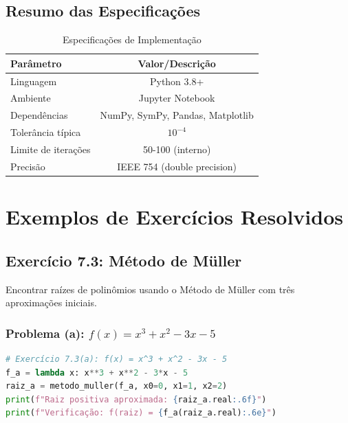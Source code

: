 \documentclass[
	12pt,				%
	openright,			%
	oneside,			%
	a4paper,			%
	english,			%
	brazil				%
	]{abntex2}
\begin{document}
\section{Resumo das Especificações}

\begin{table}[H]
    \centering
    \caption{Especificações de Implementação}
    \label{tab:especificacoes}
    \begin{tabular}{|l|c|}
    \hline
    \textbf{Parâmetro} & \textbf{Valor/Descrição} \\\hline
    Linguagem & Python 3.8+ \\\hline
    Ambiente & Jupyter Notebook \\\hline
    Dependências & NumPy, SymPy, Pandas, Matplotlib \\\hline
    Tolerância típica & $10^{-4}$ \\\hline
    Limite de iterações & 50-100 (interno) \\\hline
    Precisão & IEEE 754 (double precision) \\\hline
    \end{tabular}
\end{table}


\appendix

\chapter{Exemplos de Exercícios Resolvidos}

\section{Exercício 7.3: Método de Müller}

Encontrar raízes de polinômios usando o Método de Müller com três aproximações iniciais.

\subsection{Problema (a): $f(x) = x^3 + x^2 - 3x - 5$}

\begin{lstlisting}[language=Python, caption={Exercício 7.3(a) - Raiz via Müller}]
# Exercício 7.3(a): f(x) = x^3 + x^2 - 3x - 5
f_a = lambda x: x**3 + x**2 - 3*x - 5
raiz_a = metodo_muller(f_a, x0=0, x1=1, x2=2)
print(f"Raiz positiva aproximada: {raiz_a.real:.6f}")
print(f"Verificação: f(raiz) = {f_a(raiz_a.real):.6e}")
\end{lstlisting}
\end{document}
